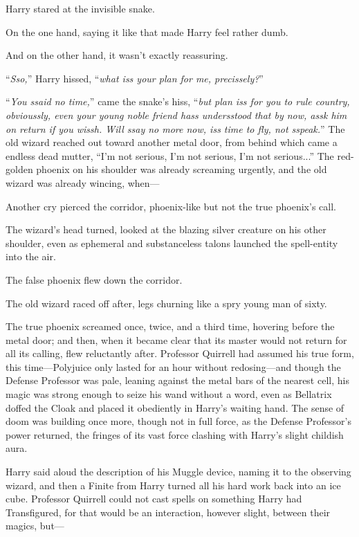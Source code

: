 Harry stared at the invisible snake.

On the one hand, saying it like that made Harry feel rather dumb.

And on the other hand, it wasn’t exactly reassuring.

“\emph{Sso,}” Harry hissed, “\emph{what iss your plan for me, precissely?}”

“\emph{You ssaid no time,}” came the snake’s hiss, “\emph{but plan iss for you to rule country, obvioussly, even your young noble friend hass undersstood that by now, assk him on return if you wissh. Will ssay no more now, iss time to fly, not sspeak.}”
\sbreak
The old wizard reached out toward another metal door, from behind which came a endless dead mutter, “I’m not serious, I’m not serious, I’m not serious...” The red-golden phoenix on his shoulder was already screaming urgently, and the old wizard was already wincing, when—

Another cry pierced the corridor, phoenix-like but not the true phoenix’s call.

The wizard’s head turned, looked at the blazing silver creature on his other shoulder, even as ephemeral and substanceless talons launched the spell-entity into the air.

The false phoenix flew down the corridor.

The old wizard raced off after, legs churning like a spry young man of sixty.

The true phoenix screamed once, twice, and a third time, hovering before the metal door; and then, when it became clear that its master would not return for all its calling, flew reluctantly after.
\sbreak
Professor Quirrell had assumed his true form, this time—Polyjuice only lasted for an hour without redosing—and though the Defense Professor was pale, leaning against the metal bars of the nearest cell, his magic was strong enough to seize his wand without a word, even as Bellatrix doffed the Cloak and placed it obediently in Harry’s waiting hand. The sense of doom was building once more, though not in full force, as the Defense Professor’s power returned, the fringes of its vast force clashing with Harry’s slight childish aura.

Harry said aloud the description of his Muggle device, naming it to the observing wizard, and then a Finite from Harry turned all his hard work back into an ice cube. Professor Quirrell could not cast spells on something Harry had Transfigured, for that would be an interaction, however slight, between their magics, but—

